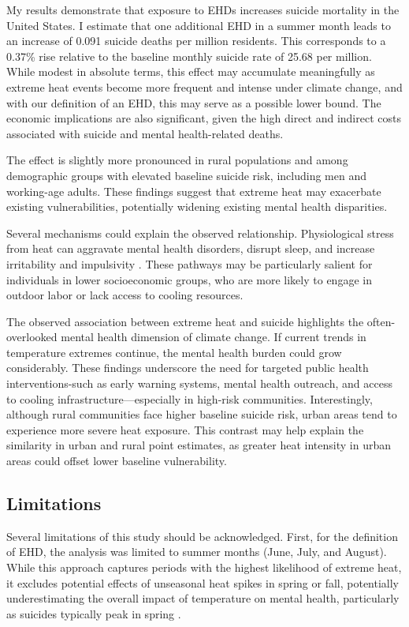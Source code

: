 \documentclass[12pt, a4paper]{article}
\begin{document}
My results demonstrate that exposure to EHDs increases suicide mortality in the United States. I estimate that one additional EHD in a summer month leads to an increase of 0.091 suicide deaths per million residents. This corresponds to a 0.37\% rise relative to the baseline monthly suicide rate of 25.68 per million. While modest in absolute terms, this effect may accumulate meaningfully as extreme heat events become more frequent and intense under climate change, and with our definition of an EHD, this may serve as a possible lower bound. The economic implications are also significant, given the high direct and indirect costs associated with suicide and mental health-related deaths.

The effect is slightly more pronounced in rural populations and among demographic groups with elevated baseline suicide risk, including men and working-age adults. These findings suggest that extreme heat may exacerbate existing vulnerabilities, potentially widening existing mental health disparities.

Several mechanisms could explain the observed relationship. Physiological stress from heat can aggravate mental health disorders, disrupt sleep, and increase irritability and impulsivity \cite{Hsiang2013}. These pathways may be particularly salient for individuals in lower socioeconomic groups, who are more likely to engage in outdoor labor or lack access to cooling resources. 

The observed association between extreme heat and suicide highlights the often-overlooked mental health dimension of climate change. If current trends in temperature extremes continue, the mental health burden could grow considerably. These findings underscore the need for targeted public health interventions-such as early warning systems, mental health outreach, and access to cooling infrastructure—especially in high-risk communities. Interestingly, although rural communities face higher baseline suicide risk, urban areas tend to experience more severe heat exposure. This contrast may help explain the similarity in urban and rural point estimates, as greater heat intensity in urban areas could offset lower baseline vulnerability.

\subsection{Limitations}

Several limitations of this study should be acknowledged. First, for the definition of EHD, the analysis was limited to summer months (June, July, and August). While this approach captures periods with the highest likelihood of extreme heat, it excludes potential effects of unseasonal heat spikes in spring or fall, potentially underestimating the overall impact of temperature on mental health, particularly as suicides typically peak in spring \cite{bridges2005}.
\end{document}
